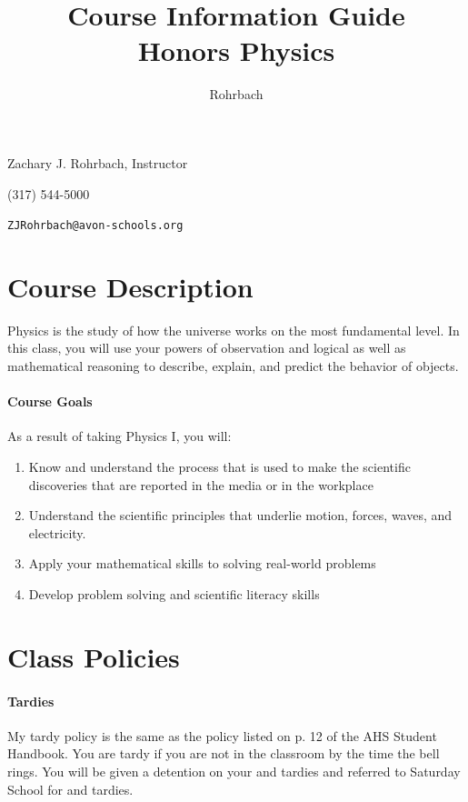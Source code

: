 \documentclass[10pt]{exam}
\title{Course Information Guide \\ Honors Physics}
\author{Rohrbach}
\newcommand{\phonenumber}{(317) 544-5000}
\begin{document}
\maketitle

\noindent Zachary J. Rohrbach, Instructor

\noindent \phonenumber

\noindent \texttt{ZJRohrbach@avon-schools.org}

\section*{Course Description}

Physics is the study of how the universe works on the most fundamental level.  In this 
class, you will use your powers of observation and logical as well as mathematical 
reasoning to describe, explain, and predict the behavior of objects.

\paragraph{Course Goals} 
As a result of taking Physics I, you will:

\begin{enumerate}
	\item Know and understand the process that is used to make the scientific discoveries that 
				are reported in the media or in the workplace
	\item Understand the scientific principles that underlie motion, forces, waves, and electricity.
	\item Apply your mathematical skills to solving real-world problems
	\item Develop problem solving and scientific literacy skills
\end{enumerate}

\section*{Class Policies}

	\paragraph{Tardies}
		My tardy policy is the same as the policy listed on p. 12  of the AHS Student Handbook.  You are tardy if you are not in the classroom by the time the bell rings.  You will be given a detention on your  and  tardies and referred to Saturday School for  and  tardies.
	
\end{document}
